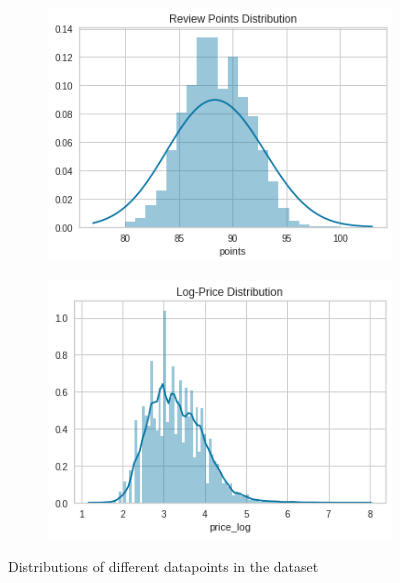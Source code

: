 \documentclass[12pt]{IEEEtran}
\begin{document}
\begin{figure}
\begin{subfigure}[t]{0.4\textwidth}
    \end{subfigure}
    \begin{subfigure}[t]{0.4\textwidth}
        \centering
        \includegraphics[width=\textwidth]{points_distribution}
    \end{subfigure}
    \begin{subfigure}[t]{0.4\textwidth}
        \centering
        \includegraphics[width=\textwidth]{log_price_distribution}
    \end{subfigure}
    \caption{Distributions of different datapoints in the dataset}
    \label{data_distributions}
\end{figure}
\end{document}

